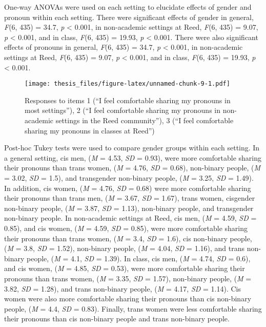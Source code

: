 \documentclass[12pt,twoside]{reedthesis}
\begin{document}
One-way ANOVAs were used on each setting to elucidate effects of gender and pronoun within each setting. There were significant effects of gender in general, \emph{F}(6, 435) = 34.7, \emph{p} \textless{} 0.001, in non-academic settings at Reed, \emph{F}(6, 435) = 9.07, \emph{p} \textless{} 0.001, and in class, \emph{F}(6, 435) = 19.93, \emph{p} \textless{} 0.001. There were also significant effects of pronouns in general, \emph{F}(6, 435) = 34.7, \emph{p} \textless{} 0.001, in non-academic settings at Reed, \emph{F}(6, 435) = 9.07, \emph{p} \textless{} 0.001, and in class, \emph{F}(6, 435) = 19.93, \emph{p} \textless{} 0.001.
\begin{figure}
\centering
\texttt{[image: thesis\_files/figure-latex/unnamed-chunk-9-1.pdf]}
\caption{\label{fig:unnamed-chunk-9}Responses to items 1 (``I feel comfortable sharing my pronouns in most settings''), 2 (``I feel comfortable sharing my pronouns in non-academic settings in the Reed community''), 3 (``I feel comfortable sharing my pronouns in classes at Reed'')}
\end{figure}
Post-hoc Tukey tests were used to compare gender groups within each setting. In a general setting, cis men, (\emph{M} = 4.53, \emph{SD} = 0.93), were more comfortable sharing their pronouns than trans women, (\emph{M} = 4.76, \emph{SD} = 0.68), non-binary people, (\emph{M} = 3.02, \emph{SD} = 1.5), and transgender non-binary people, (\emph{M} = 3.25, \emph{SD} = 1.49). In addition, cis women, (\emph{M} = 4.76, \emph{SD} = 0.68) were more comfortable sharing their pronouns than trans men, (\emph{M} = 3.67, \emph{SD} = 1.67), trans women, cisgender non-binary people, (\emph{M} = 3.87, \emph{SD} = 1.13), non-binary people, and transgender non-binary people. In non-academic settings at Reed, cis men, (\emph{M} = 4.59, \emph{SD} = 0.85), and cis women, (\emph{M} = 4.59, \emph{SD} = 0.85), were more comfortable sharing their pronouns than trans women, (\emph{M} = 3.4, \emph{SD} = 1.6), cis non-binary people, (\emph{M} = 3.8, \emph{SD} = 1.52), non-binary people, (\emph{M} = 4.04, \emph{SD} = 1.16), and trans non-binary people, (\emph{M} = 4.1, \emph{SD} = 1.39). In class, cis men, (\emph{M} = 4.74, \emph{SD} = 0.6), and cis women, (\emph{M} = 4.85, \emph{SD} = 0.53), were more comfortable sharing their pronouns than trans women, (\emph{M} = 3.35, \emph{SD} = 1.57), non-binary people, (\emph{M} = 3.82, \emph{SD} = 1.28), and trans non-binary people, (\emph{M} = 4.17, \emph{SD} = 1.14). Cis women were also more comfortable sharing their pronouns than cis non-binary people, (\emph{M} = 4.4, \emph{SD} = 0.83). Finally, trans women were less comfortable sharing their pronouns than cis non-binary people and trans non-binary people.
\end{document}
